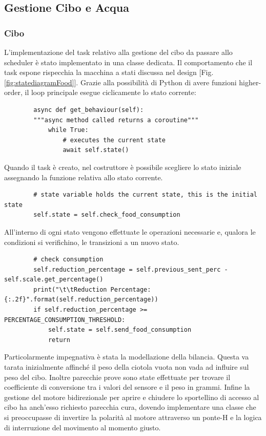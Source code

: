 \subsection{Gestione Cibo e Acqua}
    \subsubsection{Cibo}
    L'implementazione del task relativo alla gestione del cibo da passare allo scheduler è stato implementato in una classe dedicata. Il comportamento che il task espone rispecchia la macchina a stati discussa nel design [Fig. \ref{fig:statediagramFood}]. Grazie alla possibilità di Python di avere funzioni higher-order, il loop principale esegue ciclicamente lo stato corrente:
    
    \begin{lstlisting}
        async def get_behaviour(self):
        """async method called returns a coroutine"""
            while True:
                # executes the current state
                await self.state()
    \end{lstlisting}
    Quando il task è creato, nel costruttore è possibile scegliere lo stato iniziale assegnando la funzione relativa allo stato corrente. 
    \begin{lstlisting}
        # state variable holds the current state, this is the initial state
        self.state = self.check_food_consumption
    \end{lstlisting}
    All'interno di ogni stato vengono effettuate le operazioni necessarie e, qualora le condizioni si verifichino, le transizioni a un nuovo stato.
    \begin{lstlisting} 
        # check consumption
        self.reduction_percentage = self.previous_sent_perc - self.scale.get_percentage()
        print("\t\tReduction Percentage: {:.2f}".format(self.reduction_percentage))
        if self.reduction_percentage >= PERCENTAGE_CONSUMPTION_THRESHOLD:
            self.state = self.send_food_consumption
            return
    \end{lstlisting}
    Particolarmente impegnativa è stata la modellazione della bilancia. Questa va tarata inizialmente affinché il peso della ciotola vuota non vada ad influire sul peso del cibo. Inoltre parecchie prove sono state effettuate per trovare il coefficiente di conversione tra i valori del sensore e il peso in grammi.
    Infine la gestione del motore bidirezionale per aprire e chiudere lo sportellino di accesso al cibo ha anch'esso richiesto parecchia cura, dovendo implementare una classe che si preoccupasse di invertire la polarità al motore attraverso un ponte-H e la logica di interruzione del movimento al momento giusto. 
    
